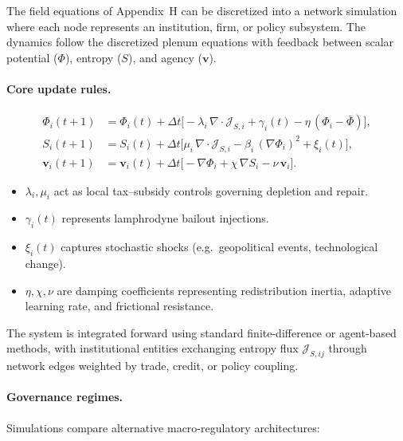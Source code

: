 \documentclass[11pt,a4paper,titlepage]{article}
\theoremstyle{definition}
\begin{document}
\begin{itemize}
The field equations of Appendix~H can be discretized into a network simulation where each node represents an institution, firm, or policy subsystem.  
The dynamics follow the discretized plenum equations with feedback between scalar potential ($\Phi$), entropy ($S$), and agency ($\mathbf{v}$).

\paragraph{Core update rules.}
\begin{align}
\Phi_i(t+1) &= \Phi_i(t) + \Delta t \Big[ -\lambda_i \, \nabla\!\cdot\!\mathcal{J}_{S,i} + \gamma_i(t) - \eta\,(\Phi_i-\bar{\Phi}) \Big], \label{eq:Phi_dyn}\\
S_i(t+1) &= S_i(t) + \Delta t \Big[ \mu_i \, \nabla\!\cdot\!\mathcal{J}_{S,i} - \beta_i\,(\nabla\Phi_i)^2 + \xi_i(t) \Big], \label{eq:S_dyn}\\
\mathbf{v}_i(t+1) &= \mathbf{v}_i(t) + \Delta t \Big[ -\nabla\Phi_i + \chi\,\nabla S_i - \nu\,\mathbf{v}_i \Big]. \label{eq:v_dyn}
\end{align}

\begin{itemize}
\item $\lambda_i,\mu_i$ act as local tax–subsidy controls governing depletion and repair.
\item $\gamma_i(t)$ represents lamphrodyne bailout injections.
\item $\xi_i(t)$ captures stochastic shocks (e.g.\ geopolitical events, technological change).
\item $\eta,\chi,\nu$ are damping coefficients representing redistribution inertia, adaptive learning rate, and frictional resistance.
\end{itemize}

The system is integrated forward using standard finite-difference or agent-based methods, with institutional entities exchanging entropy flux $\mathcal{J}_{S,ij}$ through network edges weighted by trade, credit, or policy coupling.

\paragraph{Governance regimes.}
Simulations compare alternative macro-regulatory architectures:


\end{itemize}
\end{document}
